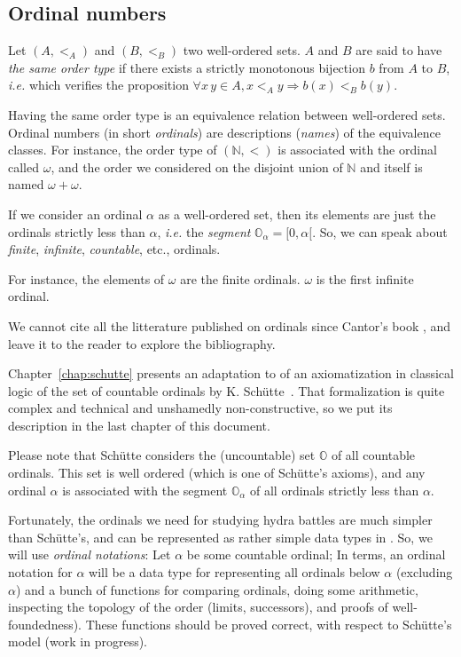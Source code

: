 \subsection{Ordinal numbers}


Let $(A,<_A)$ and $(B,<_B)$ two well-ordered sets. $A$ and $B$ are said to have \emph{the same order type} if 
there exists a strictly monotonous bijection $b$ from $A$ to $B$, \emph{i.e.} which verifies the proposition
$\forall x\,y\in A, x <_A y \Rightarrow b(x) <_B  b(y)$.

Having the same order type is an equivalence relation between well-ordered sets. Ordinal numbers (in short \emph{ordinals}) are descriptions (\emph{names}) of the equivalence classes.
For instance, the order type of $(\mathbb{N},<)$ is associated with the ordinal called  $\omega$, and the order we considered on 
the disjoint union of $\mathbb{N}$ and itself is named $\omega+\omega$.

If we consider an ordinal $\alpha$ as a well-ordered set, then its elements are just the ordinals strictly less than $\alpha$, \emph{i.e.} the \emph{segment} $\mathbb{O}_\alpha=[0, \alpha[$. So, we can speak about \emph{finite}, \emph{infinite}, \emph{countable}, etc., ordinals.

For instance, the elements of $\omega$ are the finite ordinals. $\omega$ is the first infinite ordinal.

We cannot cite all the litterature published on ordinals since Cantor's book 
\cite{cantorbook}, and 
leave it to the reader to explore the bibliography. 


Chapter~\ref{chap:schutte} presents an adaptation to \coq{} of an axiomatization in classical logic of the set of countable ordinals by K. Schütte~\cite{schutte}. 
That formalization is quite complex and technical and unshamedly non-constructive,  so we put its description  in the last chapter of this document. 



Please note that Schütte considers the (uncountable) set $\mathbb{O}$ of all countable ordinals. This set is well ordered (which is one of Schütte's axioms), and any ordinal $\alpha$ is associated with the segment $\mathbb{O}_\alpha$ 
of all ordinals strictly less than $\alpha$.

Fortunately, the ordinals we need for  studying hydra battles are much simpler than Schütte's, and can be represented as rather simple data types in \gallina. So, we will use \emph{ordinal notations}: Let $\alpha$ be some countable ordinal; In \coq{} terms, an ordinal notation for $\alpha$ will be a data type for representing all ordinals below $\alpha$ (excluding $\alpha$) and a bunch of functions for comparing ordinals, doing some arithmetic, inspecting the topology of the order (limits, successors), and proofs of well-foundedness). These functions should be proved correct, with respect to
Schütte's model (work in progress).


